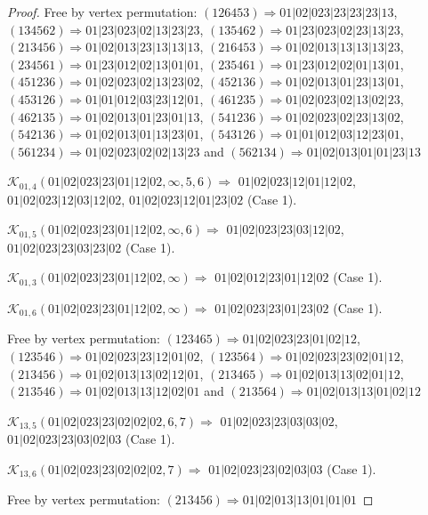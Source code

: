 \documentclass[12pt]{article}
\theoremstyle{plain}
\theoremstyle{definition}
\theoremstyle{remark}
\newcommand{\fancy}[1]{\mathcal{#1}}
\def\K{\fancy{K}}
\begin{document}
\begin{proof}
	Free by vertex permutation: $(1 2 6 4 5 3)\Rightarrow 01|02|023|23|23|23|13$, $(1 3 4 5 6 2)\Rightarrow 01|23|023|02|13|23|23$, $(1 3 5 4 6 2)\Rightarrow 01|23|023|02|23|13|23$, $(2 1 3 4 5 6)\Rightarrow 01|02|013|23|13|13|13$, $(2 1 6 4 5 3)\Rightarrow 01|02|013|13|13|13|23$, $(2 3 4 5 6 1)\Rightarrow 01|23|012|02|13|01|01$, $(2 3 5 4 6 1)\Rightarrow 01|23|012|02|01|13|01$, $(4 5 1 2 3 6)\Rightarrow 01|02|023|02|13|23|02$, $(4 5 2 1 3 6)\Rightarrow 01|02|013|01|23|13|01$, $(4 5 3 1 2 6)\Rightarrow 01|01|012|03|23|12|01$, $(4 6 1 2 3 5)\Rightarrow 01|02|023|02|13|02|23$, $(4 6 2 1 3 5)\Rightarrow 01|02|013|01|23|01|13$, $(5 4 1 2 3 6)\Rightarrow 01|02|023|02|23|13|02$, $(5 4 2 1 3 6)\Rightarrow 01|02|013|01|13|23|01$, $(5 4 3 1 2 6)\Rightarrow 01|01|012|03|12|23|01$, $(5 6 1 2 3 4)\Rightarrow 01|02|023|02|02|13|23$ and $(5 6 2 1 3 4)\Rightarrow 01|02|013|01|01|23|13$
	
	
	
	\bigskip
	
	$\K_{01,4}(01|02|023|23|01|12|02,\infty,5, 6)\Rightarrow $ $01|02|023|12|01|12|02$, $01|02|023|12|03|12|02$, $01|02|023|12|01|23|02$ (Case 1).
	
	$\K_{01,5}(01|02|023|23|01|12|02,\infty,6)\Rightarrow $ $01|02|023|23|03|12|02$, $01|02|023|23|03|23|02$ (Case 1).
	
	$\K_{01,3}(01|02|023|23|01|12|02,\infty)\Rightarrow $ $01|02|012|23|01|12|02$ (Case 1).
	
	$\K_{01,6}(01|02|023|23|01|12|02,\infty)\Rightarrow $ $01|02|023|23|01|23|02$ (Case 1).
	
	
	
	Free by vertex permutation: $(1 2 3 4 6 5)\Rightarrow 01|02|023|23|01|02|12$, $(1 2 3 5 4 6)\Rightarrow 01|02|023|23|12|01|02$, $(1 2 3 5 6 4)\Rightarrow 01|02|023|23|02|01|12$, $(2 1 3 4 5 6)\Rightarrow 01|02|013|13|02|12|01$, $(2 1 3 4 6 5)\Rightarrow 01|02|013|13|02|01|12$, $(2 1 3 5 4 6)\Rightarrow 01|02|013|13|12|02|01$ and $(2 1 3 5 6 4)\Rightarrow 01|02|013|13|01|02|12$
	
	
	
	\bigskip
	
	$\K_{13,5}(01|02|023|23|02|02|02,6, 7)\Rightarrow $ $01|02|023|23|03|03|02$, $01|02|023|23|03|02|03$ (Case 1).
	
	$\K_{13,6}(01|02|023|23|02|02|02,7)\Rightarrow $ $01|02|023|23|02|03|03$ (Case 1).
	
	
	
	Free by vertex permutation: $(2 1 3 4 5 6)\Rightarrow 01|02|013|13|01|01|01$
	

\end{proof}
\end{document}
